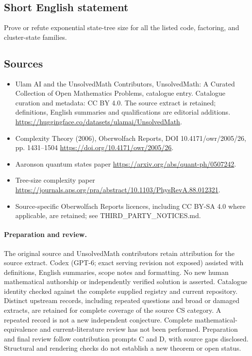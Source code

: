 \documentclass[11pt]{article}
\begin{document}
\subsection{Short English statement}
Prove or refute exponential state-tree size for all the listed code, factoring, and cluster-state families.
\subsection{Sources}
\begin{itemize}
\item[\hypertarget{source:statement:1}{S1}] Ulam AI and the UnsolvedMath Contributors, UnsolvedMath: A Curated Collection of Open Mathematics Problems, catalogue entry. Catalogue curation and metadata: CC BY 4.0. The source extract is retained; definitions, English summaries and qualifications are editorial additions.
\url{https://huggingface.co/datasets/ulamai/UnsolvedMath}.
\item[\hypertarget{source:statement:2}{S2}] Complexity Theory (2006), Oberwolfach Reports, DOI 10.4171/owr/2005/26, pp. 1431--1504
\url{https://doi.org/10.4171/owr/2005/26}.
\item[\hypertarget{source:statement:3}{S3}] Aaronson quantum states paper
\url{https://arxiv.org/abs/quant-ph/0507242}.
\item[\hypertarget{source:statement:4}{S4}] Tree-size complexity paper
\url{https://journals.aps.org/pra/abstract/10.1103/PhysRevA.88.012321}.
\item Source-specific Oberwolfach Reports licences, including CC BY-SA 4.0 where applicable, are retained; see THIRD\_PARTY\_NOTICES.md.
\end{itemize}
\paragraph{Preparation and review.}
The original source and UnsolvedMath contributors retain attribution for the source extract. Codex (GPT-6; exact serving revision not exposed) assisted with definitions, English summaries, scope notes and formatting. No new human mathematical authorship or independently verified solution is asserted. Catalogue identity checked against the complete supplied registry and current repository. Distinct upstream records, including repeated questions and broad or damaged extracts, are retained for complete coverage of the source CS category. A repeated record is not a new independent conjecture. Complete mathematical-equivalence and current-literature review has not been performed. Preparation and final review follow contribution prompts C and D, with source gaps disclosed. Structural and rendering checks do not establish a new theorem or open status.
\label{end:statement}
\end{document}
